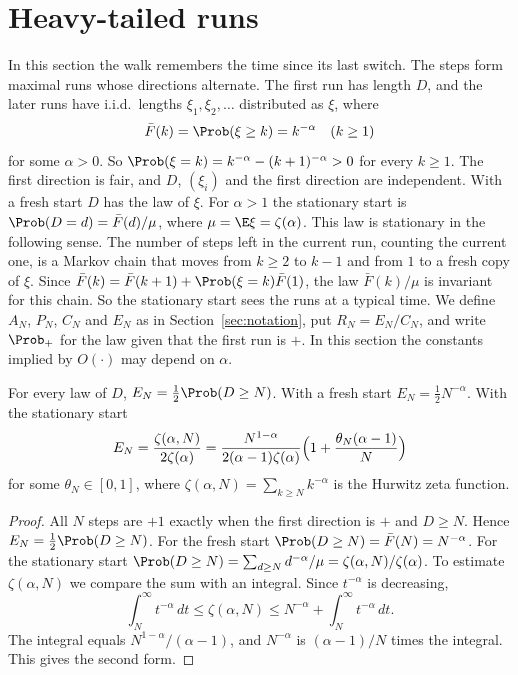 \section{Heavy-tailed runs}\label{sec:heavy}

In this section the walk remembers the time since its last switch. The steps
form maximal runs whose directions alternate. The first run has length $D$,
and the later runs have i.i.d.\ lengths $\xi_1,\xi_2,\dots$ distributed as
$\xi$, where
\[
 \bar F(k)=\Prob(\xi\ge k)=k^{-\alpha}\quad(k\ge1)
\]
for some $\alpha>0$. So $\Prob(\xi=k)=k^{-\alpha}-(k+1)^{-\alpha}>0$ for every
$k\ge1$. The first direction is fair, and $D$, $(\xi_i)$ and the first
direction are independent. With a fresh start $D$ has the law of $\xi$. For
$\alpha>1$ the stationary start is $\Prob(D=d)=\bar F(d)/\mu$, where
$\mu=\E\xi=\zeta(\alpha)$. This law is stationary in the following sense. The
number of steps left in the current run, counting the current one, is a Markov
chain that moves from $k\ge2$ to $k-1$ and from $1$ to a fresh copy of $\xi$.
Since $\bar F(k)=\bar F(k+1)+\Prob(\xi=k)\bar F(1)$, the law $\bar F(k)/\mu$
is invariant for this chain. So the stationary start sees the runs at a
typical time. We define $A_N$, $P_N$, $C_N$ and $E_N$ as in
Section~\ref{sec:notation}, put $R_N=E_N/C_N$, and write $\Prob_+$ for the law
given that the first run is $+$. In this section the constants implied by
$O(\cdot)$ may depend on $\alpha$.

\begin{proposition}\label{prop:edge}
For every law of $D$, $E_N=\frac12\Prob(D\ge N)$. With a fresh start
$E_N=\frac12N^{-\alpha}$. With the stationary start
\[
 E_N=\frac{\zeta(\alpha,N)}{2\zeta(\alpha)}
 =\frac{N^{1-\alpha}}{2(\alpha-1)\zeta(\alpha)}\Bigl(1+\frac{\theta_N(\alpha-1)}N\Bigr)
\]
for some $\theta_N\in[0,1]$, where $\zeta(\alpha,N)=\sum_{k\ge N}k^{-\alpha}$
is the Hurwitz zeta function.
\end{proposition}

\begin{proof}
All $N$ steps are $+1$ exactly when the first direction is $+$ and $D\ge N$.
Hence $E_N=\frac12\Prob(D\ge N)$. For the fresh start
$\Prob(D\ge N)=\bar F(N)=N^{-\alpha}$. For the stationary start
$\Prob(D\ge N)=\sum_{d\ge N}d^{-\alpha}/\mu=\zeta(\alpha,N)/\zeta(\alpha)$.
To estimate $\zeta(\alpha,N)$ we compare the sum with an integral. Since
$t^{-\alpha}$ is decreasing,
\[
 \int_N^\infty t^{-\alpha}\,dt\le\zeta(\alpha,N)\le N^{-\alpha}+\int_N^\infty
 t^{-\alpha}\,dt .
\]
The integral equals $N^{1-\alpha}/(\alpha-1)$, and $N^{-\alpha}$ is
$(\alpha-1)/N$ times the integral. This gives the second form.
\end{proof}

